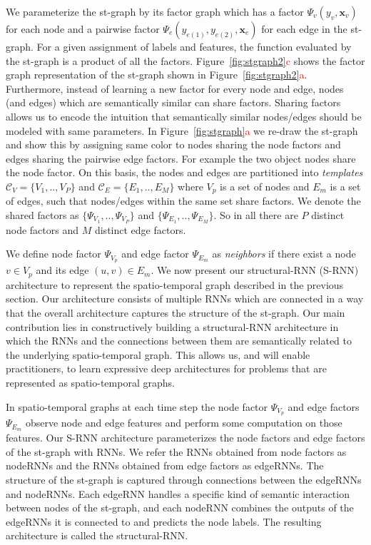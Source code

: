 \documentclass[10pt,twocolumn,letterpaper]{article}
\newcommand{\ve}[1]{\mathbf{#1}}
\newcommand{\mcal}[1]{\mathcal{#1}}
\newcommand{\rc}[1]{\textcolor{red}{#1}}
\begin{document}
We parameterize the st-graph by its factor graph which has a factor $\Psi_v(y_v,\ve{x}_v)$ for each node and a pairwise factor $\Psi_e(y_{e(1)},y_{e(2)},\ve{x}_e)$ for each edge in the st-graph. For a given assignment of labels and features, the function evaluated by the st-graph is a product of all the factors. Figure~\ref{fig:stgraph2}\rc{c} shows the factor graph representation of the st-graph shown in Figure~\ref{fig:stgraph2}\rc{a}. Furthermore, instead of learning a new factor for every node and edge, nodes (and edges) which are semantically similar can share factors. Sharing factors allows us to encode the intuition that semantically similar nodes/edges should be modeled with same parameters. In Figure~\ref{fig:stgraph}\rc{a} we re-draw the st-graph and show this by assigning same color to nodes sharing the node factors and edges sharing the pairwise edge factors. For example the two object nodes share the node factor. On this basis, the nodes and edges are partitioned into \textit{templates}$\mcal{C}_V=\{V_1,..,V_P\}$ and $\mcal{C}_E=\{E_1,..,E_M\}$ where $V_p$ is a set of nodes and $E_m$ is a set of edges, such that nodes/edges within the same set share factors. We denote the shared factors as $\{\Psi_{V_1},..,\Psi_{V_P}\}$ and $\{\Psi_{E_1},..,\Psi_{E_M}\}$. So in all there are $P$ distinct node factors and $M$ distinct edge factors. 

We define node factor $\Psi_{V_p}$ and edge factor $\Psi_{E_m}$ as \textit{neighbors} if there exist a node $v \in V_p$ and its edge $(u,v) \in {E}_m$. 
We now present our structural-RNN (S-RNN) architecture to represent the spatio-temporal graph described in the previous section. Our architecture consists of multiple RNNs which are connected in a way that the overall architecture captures the structure of the st-graph. Our main contribution lies in constructively building a structural-RNN architecture in which the RNNs and the connections between them are semantically related to the underlying spatio-temporal graph. This allows us, and will enable practitioners, to learn expressive deep architectures for problems that are represented as spatio-temporal graphs. 

In spatio-temporal graphs at each time step the node factor $\Psi_{V_p}$ and edge factors $\Psi_{E_m}$ observe node and edge features and perform some computation on those features. Our S-RNN architecture parameterizes the node factors and edge factors of the st-graph with RNNs. We refer the RNNs obtained from node factors as nodeRNNs and the RNNs obtained from edge factors as edgeRNNs.  The structure of the st-graph is captured through connections between the edgeRNNs and nodeRNNs. Each edgeRNN handles a specific kind of semantic interaction between nodes of the st-graph, and each nodeRNN combines the outputs of the edgeRNNs it is connected to and predicts the node labels.  The resulting architecture is called the structural-RNN.  
\end{document}
